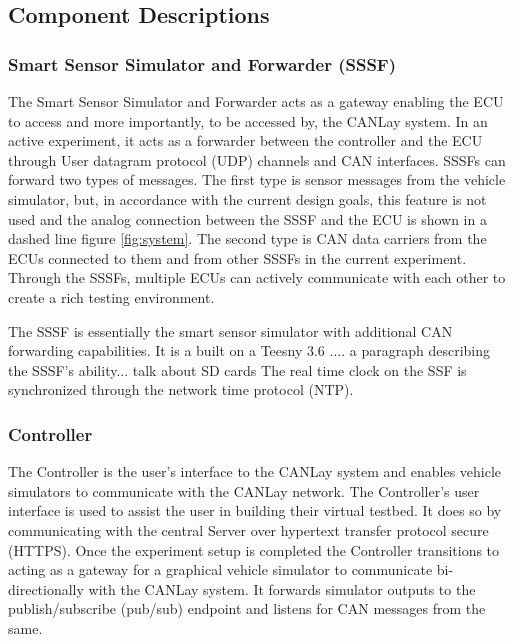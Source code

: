 \documentclass[letterpaper,twocolumn,12pt]{article}
\begin{document}


\subsection{Component Descriptions}
\subsubsection{Smart Sensor Simulator and Forwarder (SSSF)}
The Smart Sensor Simulator and Forwarder acts as a gateway enabling the ECU to access and more importantly, to be accessed by, the CANLay system. In an active experiment, it acts as a forwarder between the controller and the ECU through User datagram protocol (UDP) channels and CAN interfaces. SSSFs can forward two types of messages. The first type is sensor messages from the vehicle simulator, but, in accordance with the current design goals, this feature is not used and the analog connection between the SSSF and the ECU is shown in a dashed line figure \ref{fig:system}.  
The second type is CAN data carriers from the ECUs connected to them and from other SSSFs in the current experiment. Through the SSSFs, multiple ECUs can actively communicate with each other to create a rich testing environment.

The SSSF is essentially the smart sensor simulator with additional CAN forwarding capabilities. It is a built on a Teesny 3.6 .... a paragraph describing the SSSF's ability...
talk about SD cards
The real time clock on the SSF is synchronized through the network time protocol (NTP).

\subsubsection{Controller}
The Controller is the user's interface to the CANLay system and enables vehicle simulators to communicate with the CANLay network. The Controller’s user interface is used to assist the user in building their virtual testbed. 
It does so by communicating with the central Server over hypertext transfer protocol secure (HTTPS). 
Once the experiment setup is completed the Controller transitions to acting as a gateway for a graphical vehicle simulator to communicate bi-directionally with the CANLay system. It forwards simulator outputs to the publish/subscribe (pub/sub) endpoint and listens for CAN messages from the same.
\end{document}
